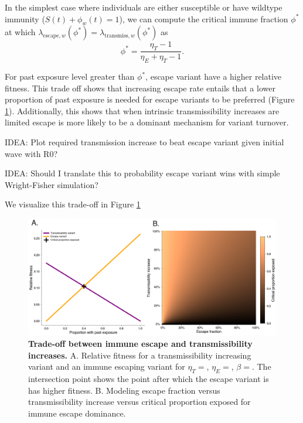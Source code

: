 \documentclass[12pt,oneside,letterpaper]{article}
\newcommand{\varE}{\text{escape}}
\newcommand{\varT}{\text{transmiss}}
\begin{document}
In the simplest case where individuals are either susceptible or have wildtype immunity ($S(t) + \phi_{w}(t) = 1$), we can compute the critical immune fraction $\phi^{*}$ at which $\lambda_{\varE, w}(\phi^{*}) = \lambda_{\varT, w}(\phi^{*})$ as
\begin{equation} \label{eq:critical_immunity}
    \phi^{*} = \frac{\eta_{T} - 1}{\eta_{E} + \eta_{T} - 1}.
\end{equation}

For past exposure level greater than $\phi^{*}$, escape variant have a higher relative fitness.
This trade off shows that increasing escape rate entails that a lower proportion of past exposure is needed for escape variants to be preferred (Figure \ref{fig:transmission_tradeoff}). 
Additionally, this shows that when intrinsic transmissibility increases are limited escape is more likely to be a dominant mechanism for variant turnover.

IDEA: Plot required transmission increase to beat escape variant given initial wave with R0?

IDEA: Should I translate this to probability escape variant wins with simple Wright-Fisher simulation?


We visualize this trade-off in Figure \ref{fig:transmission_tradeoff}

\begin{figure}[h]
    \centering
    \includegraphics[width=0.8\linewidth]{./figures/transmission_tradeoff.png}
    \caption{\textbf{Trade-off between immune escape and transmissibility increases.} 
    A. Relative fitness for a transmissibility increasing variant and an immune escaping variant for $\eta_{T}=$, $\eta_{E}=$, $\beta=$. 
    The intersection point shows the point after which the escape variant is has higher fitness. 
    B. Modeling escape fraction versus transmissibility increase versus critical proportion exposed for immune escape dominance.}%
    \label{fig:transmission_tradeoff}
\end{figure}
\end{document}
